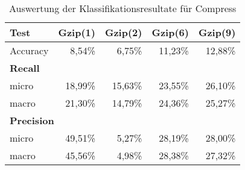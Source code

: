 \begin{frame}[c]
\begin{itemize}
\begin{table}[htbp]
\begin{tabular}{|l|r|r|r|r|}
\hline
\textbf{Test} & \textbf{Gzip(1)} & \textbf{Gzip(2)} &
\textbf{Gzip(6)} & \textbf{Gzip(9)} \\ \hline Accuracy & 8,54\% & 6,75\% & 11,23\% & 12,88\% \\ \hline
\multicolumn{5}{|l|}{\textbf{Recall}}  \\ \hline micro & 18,99\% & 15,63\% &
23,55\% & 26,10\% \\ \hline macro & 21,30\% & 14,79\% & 24,36\% & 25,27\% \\ \hline
\multicolumn{5}{|l|}{\textbf{Precision}}  \\ \hline micro & 49,51\% & 5,27\% &
28,19\% & 28,00\% \\ \hline macro & 45,56\% & 4,98\% & 28,38\% & 27,32\% \\ \hline
\end{tabular}
\caption{Auswertung der Klassifikationsresultate für Compress}
\label{tbl:GzipAccuResults}
\end{table}
  
\end{itemize}
\end{frame}


